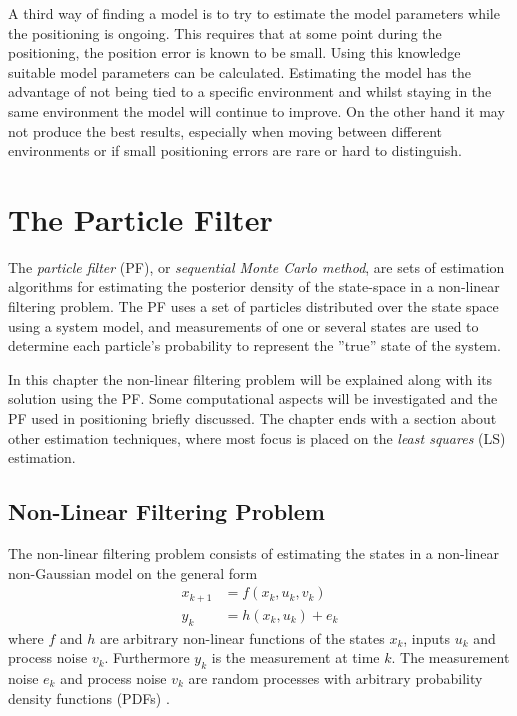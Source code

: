 \documentclass{LTHthesis}
\begin{document}
 A third way of finding a model is to try to estimate the model parameters while the positioning is ongoing. This requires that at some point during the positioning, the position error is known to be small. Using this knowledge suitable model parameters can be calculated. Estimating the model has the advantage of not being tied to a specific environment and whilst staying in the same environment the model will continue to improve. On the other hand it may not produce the best results, especially when moving between different environments or if small positioning errors are rare or hard to distinguish.        
\chapter{The Particle Filter}
\label{chap:PF}
%
The \emph{particle filter} (PF), or \emph{sequential Monte Carlo method}, are sets of estimation algorithms for estimating the posterior density of the state-space in a non-linear filtering problem. The PF uses a set of particles distributed over the state space using a system model, and measurements of one or several states are used to determine each particle's probability to represent the ''true'' state of the system.  

In this chapter the non-linear filtering problem will be explained along with its solution using the PF. Some computational aspects will be investigated and the PF used in positioning briefly discussed. The chapter ends with a section about other estimation techniques, where most focus is placed on the \emph{least squares} (LS) estimation.
%
\section{Non-Linear Filtering Problem}
\label{sec:nlfp}
The non-linear filtering problem consists of estimating the states in a non-linear non-Gaussian model on the general form
%
\begin{subequations}
\label{equation:nonlinear_model}
\begin{align}
x_{k+1} &= f(x_k,u_k,v_k) \label{equation:nonlinear_model_first}\\
y_k&=h(x_k,u_k) + e_k
\label{equation:nonlinear_model_second}
\end{align}
\end{subequations} 
%
where $f$ and $h$ are arbitrary non-linear functions of the states $x_k$, inputs $u_k$ and process noise $v_k$. Furthermore $y_k$ is the measurement at time $k$. The measurement noise $e_k$ and process noise $v_k$ are random processes with arbitrary probability density functions (PDFs) \cite{gson12}. 
\end{document}
